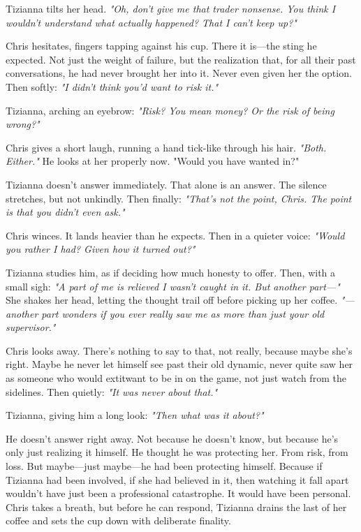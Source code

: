 Tizianna tilts her head. \textit{"Oh, don't give me that trader nonsense. You think I wouldn’t understand what actually happened? That I can’t keep up?"}

\smallskip

Chris hesitates, fingers tapping against his cup. There it is—the sting he expected. Not just the weight of failure, but the realization that, for all their past conversations, he had never brought her into it. Never even given her the option. Then softly: \textit{"I didn’t think you’d want to risk it."}

\smallskip

{Tizianna}, arching an eyebrow: \textit{"Risk? You mean money? Or the risk of being wrong?"}

\smallskip

Chris gives a short laugh, running a hand tick-like through his hair. \textit{"Both. Either."} He looks at her properly now. "Would you have wanted in?"

\smallskip

Tizianna doesn’t answer immediately. That alone is an answer. The silence stretches, but not unkindly. Then finally: \textit{"That’s not the point, Chris. The point is that you didn’t even ask."}

\smallskip

Chris winces. It lands heavier than he expects. Then in a quieter voice: \textit{"Would you rather I had? Given how it turned out?"}

\smallskip

Tizianna studies him, as if deciding how much honesty to offer. Then, with a small sigh: \textit{"A part of me is relieved I wasn’t caught in it. But another part—"} She shakes her head, letting the thought trail off before picking up her coffee. \textit{"—another part wonders if you ever really saw me as more than just your old supervisor."}

\smallskip

Chris looks away. There’s nothing to say to that, not really, because maybe she’s right. Maybe he never let himself see past their old dynamic, never quite saw her as someone who would extit{want} to be in on the game, not just watch from the sidelines. Then quietly: \textit{"It was never about that."}

\smallskip

{Tizianna}, giving him a long look: \textit{"Then what was it about?"}

\smallskip

He doesn’t answer right away. Not because he doesn’t know, but because he’s only just realizing it himself. He thought he was protecting her. From risk, from loss. But maybe—just maybe—he had been protecting himself. Because if Tizianna had been involved, if she had believed in it, then watching it fall apart wouldn’t have just been a professional catastrophe. It would have been personal. Chris takes a breath, but before he can respond, Tizianna drains the last of her coffee and sets the cup down with deliberate finality.


